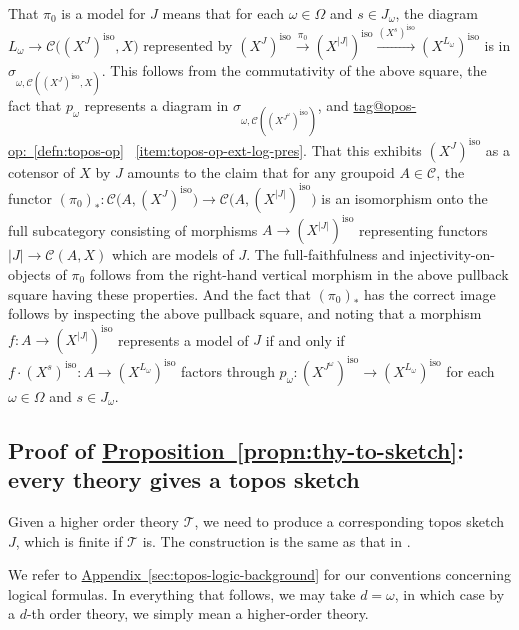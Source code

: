 \documentclass{amsart}
\makeatletter
\newcommand\abs[2][]{#1\lvert{#2}#1\rvert}
\newcommand\alttext{\texorpdfstring}
\newcommand\cC{\mathcal{C}}
\newcommand\cT{\mathcal{T}}
\newcommand\iso{\mathrm{iso}}
\newcommand\pbig[1]{\big({#1}\big)}
\newcommand\tox[2][]{\xrightarrow[#1]{#2}}
\newcommand\tagword[1]{\csname tag@#1\endcsname}
\def\label@tag#1:#2\@nil{#1}
\newcommand\labeltag[1]{\label@tag#1:\@nil}
\newcommand\jref[1]{%
  \texorpdfstring%
    {\hyperref[#1]{\tagword{\labeltag{#1}}~\ref*{#1}}}%
    {\tagword{\labeltag{#1}}~\ref*{#1}}%
}
\newcommand\prerefpost[3]{%
  \texorpdfstring%
    {\hyperref[#2]{#1\ref*{#2}#3}}%
    {#1\ref*{#2}#3}%
}
\newcommand\aref[1]{\prerefpost{Appendix~}{#1}{}}
\theoremstyle{definition}
\theoremstyle{remark}
\theoremstyle{plainwithref}
\makeatother
\begin{document}
  That \( \pi_0 \) is a model for \( J \) means that for each \( \omega \in \Omega \) and \( s \in J_\omega \), the diagram \( L_\omega \to \cC\pbig{(X^J)^\iso, X} \) represented by \( (X^J)^\iso \tox{\pi_0} (X^{\abs{J}})^\iso \tox{(X^s)^\iso} (X^{L_\omega})^\iso \) is in \( \sigma_{\omega, \cC((X^J)^\iso, X)} \).
  This follows from the commutativity of the above square, the fact that \( p_\omega \) represents a diagram in \( \sigma_{\omega, \cC((X^{J^\omega})^\iso)} \), and \jref{defn:topos-op}~\ref{item:topos-op-ext-log-pres}.
  That this exhibits \( (X^J)^\iso \) as a cotensor of \( X \) by \( J \) amounts to the claim that for any groupoid \( A \in \cC \), the functor \( (\pi_0)_* \colon \cC\pbig{A, (X^J)^\iso} \to \cC\pbig{A, (X^{\abs J})^\iso} \) is an isomorphism onto the full subcategory consisting of morphisms \( A \to (X^{\abs J})^\iso \) representing functors \( \abs{J} \to \cC(A, X) \) which are models of \( J \).
  The full-faithfulness and injectivity-on-objects of \( \pi_0 \) follows from the right-hand vertical morphism in the above pullback square having these properties.
  And the fact that \( (\pi_0)_* \) has the correct image follows by inspecting the above pullback square, and noting that a morphism \( f \colon A \to (X^{\abs J})^\iso \) represents a model of \( J \) if and only if \( f \cdot (X^s)^\iso \colon A \to (X^{L_\omega})^\iso \) factors through \( p_\omega \colon (X^{J^\omega})^\iso \to (X^{L_\omega})^\iso \) for each \( \omega \in \Omega \) and \( s \in J_\omega \).

\subsection{Proof of \alttext{\hyperref[propn:thy-to-sketch]{Proposition~\ref*{propn:thy-to-sketch}}}{Proposition~\ref*{propn:thy-to-sketch}}: every theory gives a topos sketch} \label{subsec:thy-to-sketch-proof}
Given a higher order theory \( \cT \), we need to produce a corresponding topos sketch \( J \), which is finite if \( \cT \) is.
The construction is the same as that in \cite[\S9]{makkai-generalized-sketches-all}.

We refer to \aref{sec:topos-logic-background} for our conventions concerning logical formulas.
In everything that follows, we may take \( d = \omega \), in which case by a \( d \)-th order theory, we simply mean a higher-order theory.
\end{document}
